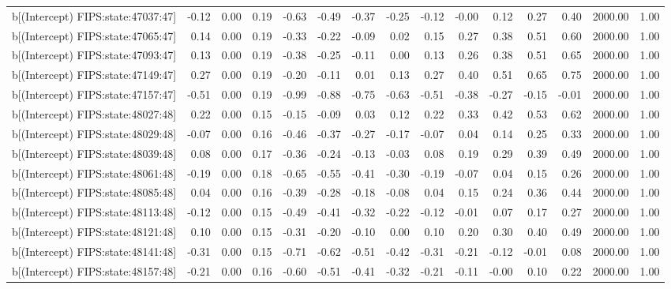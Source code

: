 \begin{table}[ht]
\begin{tabular}{rrrrrrrrrrrrrrr}
  b[(Intercept) FIPS:state:47037:47] & -0.12 & 0.00 & 0.19 & -0.63 & -0.49 & -0.37 & -0.25 & -0.12 & -0.00 & 0.12 & 0.27 & 0.40 & 2000.00 & 1.00 \\ 
  b[(Intercept) FIPS:state:47065:47] & 0.14 & 0.00 & 0.19 & -0.33 & -0.22 & -0.09 & 0.02 & 0.15 & 0.27 & 0.38 & 0.51 & 0.60 & 2000.00 & 1.00 \\ 
  b[(Intercept) FIPS:state:47093:47] & 0.13 & 0.00 & 0.19 & -0.38 & -0.25 & -0.11 & 0.00 & 0.13 & 0.26 & 0.38 & 0.51 & 0.65 & 2000.00 & 1.00 \\ 
  b[(Intercept) FIPS:state:47149:47] & 0.27 & 0.00 & 0.19 & -0.20 & -0.11 & 0.01 & 0.13 & 0.27 & 0.40 & 0.51 & 0.65 & 0.75 & 2000.00 & 1.00 \\ 
  b[(Intercept) FIPS:state:47157:47] & -0.51 & 0.00 & 0.19 & -0.99 & -0.88 & -0.75 & -0.63 & -0.51 & -0.38 & -0.27 & -0.15 & -0.01 & 2000.00 & 1.00 \\ 
  b[(Intercept) FIPS:state:48027:48] & 0.22 & 0.00 & 0.15 & -0.15 & -0.09 & 0.03 & 0.12 & 0.22 & 0.33 & 0.42 & 0.53 & 0.62 & 2000.00 & 1.00 \\ 
  b[(Intercept) FIPS:state:48029:48] & -0.07 & 0.00 & 0.16 & -0.46 & -0.37 & -0.27 & -0.17 & -0.07 & 0.04 & 0.14 & 0.25 & 0.33 & 2000.00 & 1.00 \\ 
  b[(Intercept) FIPS:state:48039:48] & 0.08 & 0.00 & 0.17 & -0.36 & -0.24 & -0.13 & -0.03 & 0.08 & 0.19 & 0.29 & 0.39 & 0.49 & 2000.00 & 1.00 \\ 
  b[(Intercept) FIPS:state:48061:48] & -0.19 & 0.00 & 0.18 & -0.65 & -0.55 & -0.41 & -0.30 & -0.19 & -0.07 & 0.04 & 0.15 & 0.26 & 2000.00 & 1.00 \\ 
  b[(Intercept) FIPS:state:48085:48] & 0.04 & 0.00 & 0.16 & -0.39 & -0.28 & -0.18 & -0.08 & 0.04 & 0.15 & 0.24 & 0.36 & 0.44 & 2000.00 & 1.00 \\ 
  b[(Intercept) FIPS:state:48113:48] & -0.12 & 0.00 & 0.15 & -0.49 & -0.41 & -0.32 & -0.22 & -0.12 & -0.01 & 0.07 & 0.17 & 0.27 & 2000.00 & 1.00 \\ 
  b[(Intercept) FIPS:state:48121:48] & 0.10 & 0.00 & 0.15 & -0.31 & -0.20 & -0.10 & 0.00 & 0.10 & 0.20 & 0.30 & 0.40 & 0.49 & 2000.00 & 1.00 \\ 
  b[(Intercept) FIPS:state:48141:48] & -0.31 & 0.00 & 0.15 & -0.71 & -0.62 & -0.51 & -0.42 & -0.31 & -0.21 & -0.12 & -0.01 & 0.08 & 2000.00 & 1.00 \\ 
  b[(Intercept) FIPS:state:48157:48] & -0.21 & 0.00 & 0.16 & -0.60 & -0.51 & -0.41 & -0.32 & -0.21 & -0.11 & -0.00 & 0.10 & 0.22 & 2000.00 & 1.00 \\ 

\end{tabular}
\end{table}
